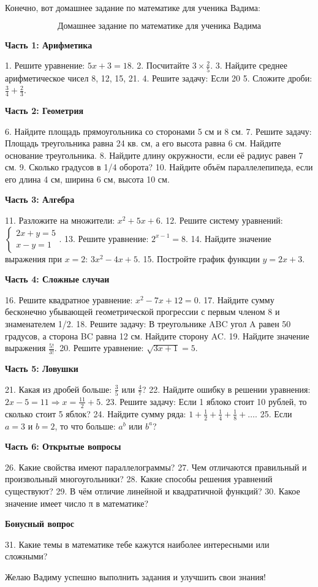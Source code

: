 \documentclass{article}
\begin{document}
Конечно, вот домашнее задание по математике для ученика Вадима:

\[
\text{Домашнее задание по математике для ученика Вадима}
\]

\textbf{Часть 1: Арифметика}

1. Решите уравнение: \(5x + 3 = 18\).
2. Посчитайте \(3 \times \frac{2}{5}\).
3. Найдите среднее арифметическое чисел 8, 12, 15, 21.
4. Решите задачу: Если 20%
5. Сложите дроби: \(\frac{3}{4} + \frac{2}{3}\).

\textbf{Часть 2: Геометрия}

6. Найдите площадь прямоугольника со сторонами 5 см и 8 см.
7. Решите задачу: Площадь треугольника равна 24 кв. см, а его высота равна 6 см. Найдите основание треугольника.
8. Найдите длину окружности, если её радиус равен 7 см.
9. Сколько градусов в 1/4 оборота?
10. Найдите объём параллелепипеда, если его длина 4 см, ширина 6 см, высота 10 см.

\textbf{Часть 3: Алгебра}

11. Разложите на множители: \(x^2 + 5x + 6\).
12. Решите систему уравнений: \(\begin{cases} 2x + y = 5 \\ x - y = 1 \end{cases}\).
13. Решите уравнение: \(2^{x-1} = 8\).
14. Найдите значение выражения при \(x = 2\): \(3x^2 - 4x + 5\).
15. Постройте график функции \(y = 2x + 3\).

\textbf{Часть 4: Сложные случаи}

16. Решите квадратное уравнение: \(x^2 - 7x + 12 = 0\).
17. Найдите сумму бесконечно убывающей геометрической прогрессии с первым членом 8 и знаменателем 1/2.
18. Решите задачу: В треугольнике ABC угол A равен 50 градусов, а сторона BC равна 12 см. Найдите сторону AC.
19. Найдите значение выражения \(\frac{5!}{3!}\).
20. Решите уравнение: \(\sqrt{3x + 1} = 5\).

\textbf{Часть 5: Ловушки}

21. Какая из дробей больше: \(\frac{3}{5}\) или \(\frac{4}{7}\)?
22. Найдите ошибку в решении уравнения: \(2x - 5 = 11 \Rightarrow x = \frac{11}{2} + 5\).
23. Решите задачу: Если 1 яблоко стоит 10 рублей, то сколько стоит 5 яблок?
24. Найдите сумму ряда: \(1 + \frac{1}{2} + \frac{1}{4} + \frac{1}{8} + \ldots\).
25. Если \(a = 3\) и \(b = 2\), то что больше: \(a^b\) или \(b^a\)?

\textbf{Часть 6: Открытые вопросы}

26. Какие свойства имеют параллелограммы?
27. Чем отличаются правильный и произвольный многоугольники?
28. Какие способы решения уравнений существуют?
29. В чём отличие линейной и квадратичной функций?
30. Какое значение имеет число π в математике?

\textbf{Бонусный вопрос}

31. Какие темы в математике тебе кажутся наиболее интересными или сложными?

Желаю Вадиму успешно выполнить задания и улучшить свои знания!
\end{document}
